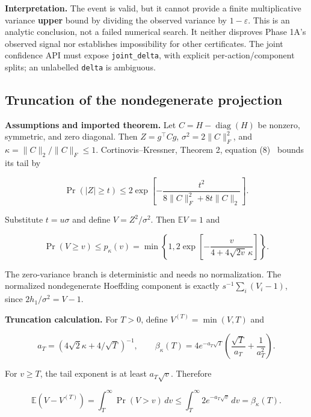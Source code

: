 \textbf{Interpretation.} The event is valid, but it cannot provide a finite multiplicative variance \textbf{upper} bound by dividing the observed variance by $1-\varepsilon$. This is an analytic conclusion, not a failed numerical search. It neither disproves Phase 1A's observed signal nor establishes impossibility for other certificates. The joint confidence API must expose \texttt{joint\_delta}, with explicit per-action/component splits; an unlabelled \texttt{delta} is ambiguous.

\subsection{Truncation of the nondegenerate projection}
\textbf{Assumptions and imported theorem.} Let $C=H-\operatorname{diag}(H)$ be nonzero, symmetric, and zero diagonal. Then $Z=g^\top Cg$, $\sigma^2=2\|C\|_F^2$, and $\kappa=\|C\|_2/\|C\|_F\le1$. Cortinovis--Kressner, Theorem 2, equation (8)~\cite{cortinovis2022} bounds its tail by


\begin{equation}
\Pr(|Z|\ge t)\le2\exp\!\left[-\frac{t^2}{8\|C\|_F^2+8t\|C\|_2}\right].
\end{equation}


Substitute $t=u\sigma$ and define $V=Z^2/\sigma^2$. Then $\mathbb EV=1$ and


\begin{equation}
\Pr(V\ge v)\le p_\kappa(v)
=\min\left\{1,2\exp\!\left[-\frac{v}{4+4\sqrt{2v}\,\kappa}\right]\right\}.
\end{equation}


The zero-variance branch is deterministic and needs no normalization. The normalized nondegenerate Hoeffding component is exactly $s^{-1}\sum_i(V_i-1)$, since $2h_1/\sigma^2=V-1$.


\textbf{Truncation calculation.} For $T>0$, define $V^{(T)}=\min(V,T)$ and


\begin{equation}
a_T=(4\sqrt2\kappa+4/\sqrt T)^{-1},\qquad
\beta_\kappa(T)=4e^{-a_T\sqrt T}
\left(\frac{\sqrt T}{a_T}+\frac1{a_T^2}\right).
\end{equation}


For $v\ge T$, the tail exponent is at least $a_T\sqrt v$. Therefore


\begin{equation}
\mathbb E(V-V^{(T)})=\int_T^\infty\Pr(V>v)\,dv
\le\int_T^\infty2e^{-a_T\sqrt v}\,dv=\beta_\kappa(T).
\end{equation}


